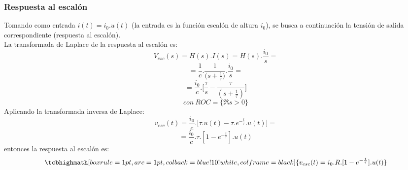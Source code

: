 \subsubsection{Respuesta al escalón}\label{sec:respuesta_escalon}
Tomando como entrada $i(t)=i_0.u(t)$ (la entrada es la función escalón de altura $i_0$), se busca a continuación la tensión de salida correspondiente (respuesta al escalón).\\
La transformada de Laplace de la respuesta al escalón es\cite{10.5555/248702}:
\[V_{esc}(s)=H(s).I(s)=H(s).\frac{i_0}{s}=\]
\[=\frac{1}{c}.\frac{1}{\big(s+\frac{1}{\tau}\big)} . \frac{i_0}{s}=\]
\[= \frac{i_0}{c}.\Bigg[\frac{\tau}{s}-\frac{\tau}{(s+\frac{1}{\tau})}\Bigg]\]
\[con\ ROC=\big\{\Re{s}>0\big\}\]
Aplicando la transformada inversa de Laplace\cite{10.5555/248702}:
\[v_{esc}(t)=\frac{i_0}{c}.\Bigg[\tau.u(t)-\tau.e^{-\frac{t}{\tau}}.u(t)\Bigg]=\]
\[=\frac{i_0}{c}.\tau.[1-e^{-\frac{t}{\tau}}].u(t)\]
entonces la respuesta al escalón es: 
\begin{equation}\label{eq:respuesta_escalon_leaky_integrator}
    \tcbhighmath[boxrule=1pt,arc=1pt,colback=blue!10!white,colframe=black]{v_{esc}(t)=i_0.R.[1-e^{-\frac{t}{\tau}}].u(t)}
\end{equation}
